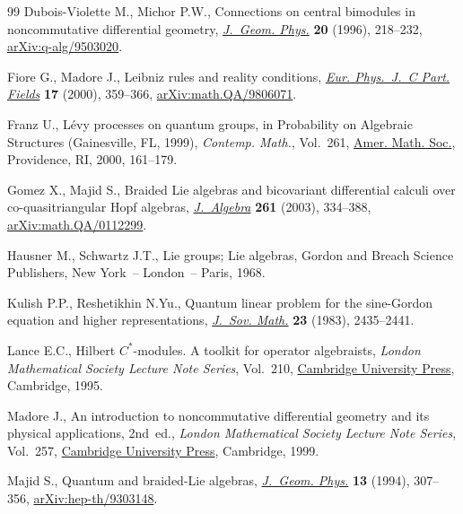 \documentclass[pdftex]{sigma}
\numberwithin{equation}{section}
\newcommand{\<}{\langle}
\renewcommand{\>}{\rangle}
\begin{document}
\begin{thebibliography}{99}
Dubois-Violette M., Michor P.W., Connections on central bimodules in
 noncommutative differential geometry, \href{https://doi.org/10.1016/0393-0440(95)00057-7}{\textit{J.~Geom. Phys.}} \textbf{20}
 (1996), 218--232, \href{https://arxiv.org/abs/q-alg/9503020}{arXiv:q-alg/9503020}.

Fiore G., Madore J., Leibniz rules and reality conditions, \href{https://doi.org/10.1007/s100520000470}{\textit{Eur.
 Phys.~J.~C Part. Fields}} \textbf{17} (2000), 359--366,
 \href{https://arxiv.org/abs/math.QA/9806071}{arXiv:math.QA/9806071}.

Franz U., L\'evy processes on quantum groups, in Probability on Algebraic
 Structures ({G}ainesville, {FL}, 1999), \textit{Contemp. Math.}, Vol.~261,
 \href{https://doi.org/10.1090/conm/261/04139}{Amer. Math. Soc.}, Providence, RI, 2000, 161--179.

Gomez X., Majid S., Braided {L}ie algebras and bicovariant differential calculi
 over co-quasitriangular {H}opf algebras, \href{https://doi.org/10.1016/S0021-8693(02)00580-X}{\textit{J.~Algebra}} \textbf{261}
 (2003), 334--388, \href{https://arxiv.org/abs/math.QA/0112299}{arXiv:math.QA/0112299}.

Hausner M., Schwartz J.T., Lie groups; {L}ie algebras, Gordon and Breach
 Science Publishers, New York~-- London~-- Paris, 1968.

Kulish P.P., Reshetikhin N.Yu., Quantum linear problem for the sine-{G}ordon
 equation and higher representations, \href{https://doi.org/10.1007/BF01084171}{\textit{J.~Sov. Math.}} \textbf{23}
 (1983), 2435--2441.

Lance E.C., Hilbert {$C^*$}-modules. A toolkit for operator algebraists,
 \textit{London Mathematical Society Lecture Note Series}, Vol.~210, \href{https://doi.org/10.1017/CBO9780511526206}{Cambridge
 University Press}, Cambridge, 1995.

Madore J., An introduction to noncommutative differential geometry and its
 physical applications, 2nd~ed., \textit{London Mathematical Society Lecture Note
 Series}, Vol.~257, \href{https://doi.org/10.1017/CBO9780511569357}{Cambridge University Press}, Cambridge, 1999.

Majid S., Quantum and braided-{L}ie algebras, \href{https://doi.org/10.1016/0393-0440(94)90014-0}{\textit{J.~Geom. Phys.}}
 \textbf{13} (1994), 307--356, \href{https://arxiv.org/abs/hep-th/9303148}{arXiv:hep-th/9303148}.


\end{thebibliography}
\end{document}
